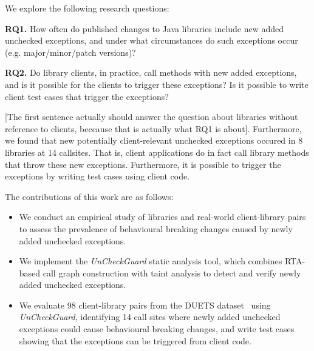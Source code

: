 We explore the following research questions:

\noindent
{\bf RQ1.} How often do published changes to Java libraries include new added unchecked exceptions,
and under what circumstances do such exceptions occur (e.g. major/minor/patch versions)?

\noindent
{\bf RQ2.} Do library clients, in practice, call methods with new added exceptions, and is it possible for the clients to trigger these exceptions? Is it possible to write client test cases that trigger the exceptions?

[The first sentence actually should answer the question about libraries without reference to clients, beccause that is actually what RQ1 is about]. %
Furthermore, we found that new potentially client-relevant unchecked exceptions occured in 8 libraries at 14 callsites. That is, client applications do in fact call library methods that throw these new exceptions. Furthermore, it is possible to trigger the exceptions by writing test cases using client code.


The contributions of this work are as follows:

\begin{itemize}[noitemsep]
\item We conduct an empirical study of libraries and real-world client-library pairs to assess the prevalence of behavioural breaking changes caused by newly added unchecked exceptions.
\item We implement the \textit{UnCheckGuard} static analysis tool, which combines RTA-based call graph construction with taint analysis to detect and verify newly added unchecked exceptions.
\item We evaluate 98 client-library pairs from the DUETS dataset~\cite{durieux21:_duets} using \textit{UnCheckGuard}, identifying 14 call sites where newly added unchecked exceptions could cause behavioural breaking changes, and write test cases showing that the exceptions can be triggered from client code.
\end{itemize}


